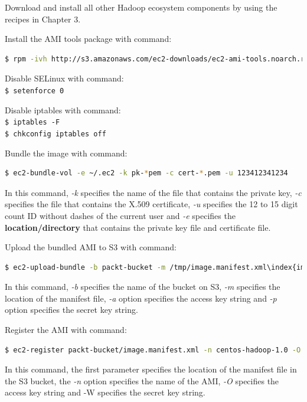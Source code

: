 Download and install all other Hadoop ecosystem components by using the recipes in Chapter 3.

Install the AMI tools package with command:
\lstset{style=bashstyle}
\begin{lstlisting}[language=bash]
$ rpm -ivh http://s3.amazonaws.com/ec2-downloads/ec2-ami-tools.noarch.rpm
\end{lstlisting}

Disable SELinux with command:\\
\verb|$ setenforce 0|

Disable iptables with command: \\
\verb|$ iptables -F| \\
\verb|$ chkconfig iptables off|

Bundle the image with command:
\lstset{style=bashstyle}
\begin{lstlisting}[language=bash]
$ ec2-bundle-vol -e ~/.ec2 -k pk-*pem -c cert-*.pem -u 123412341234
\end{lstlisting}

In this command, \emph{-k} specifies the name of the file that contains the private key, \emph{-c} specifies the file that contains the X.509 certificate, \emph{-u} specifies the 12 to 15 digit count ID without dashes of the current user and \emph{-e} specifies the \textbf{location/directory} that contains the private key file and certificate file.

Upload the bundled AMI to S3 with command: 
\lstset{style=bashstyle}
\begin{lstlisting}[language=bash]
$ ec2-upload-bundle -b packt-bucket -m /tmp/image.manifest.xml\index{image.manifest.xml} -a AKIAJ7GAQT52MZKJA4WQ -p QDHHZ0/Mj5pDYFWKpqEzXhwjqM1UB+cqjGQQ6l3S
\end{lstlisting}

In this command, \emph{-b} specifies the name of the bucket on S3, \emph{-m} specifies the location of the manifest file, \emph{-a} option specifies the access key string and \emph{-p} option specifies the secret key string.

Register the AMI with command:
\lstset{style=bashstyle}
\begin{lstlisting}[language=bash]
$ ec2-register packt-bucket/image.manifest.xml -n centos-hadoop-1.0 -O AKIAJ7GAQT52MZKJA4WQ -W QDHHZ0/Mj5pDYFWKpqEzXhwjqM1UB+cqjGQQ6l3S
\end{lstlisting}

In this command, the first parameter specifies the location of the manifest file in the S3 bucket, the \emph{-n} option specifies the name of the AMI, \emph{-O} specifies the access key string and -W specifies the secret key string.

